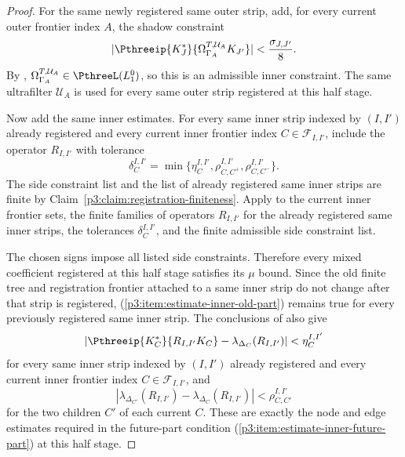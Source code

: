 \documentclass[11pt,reqno]{amsart}
\makeatletter
\theoremstyle{plain}
\theoremstyle{definition}
\newcounter{problempaper}
\newenvironment{problempaperbody}{%
  \setcounter{subsection}{0}%
  \setcounter{subsubsection}{0}%
  \setcounter{paragraph}{0}%
  \renewcommand{\thesubsection}{\arabic{subsection}}%
  \renewcommand{\thesubsubsection}{\thesubsection.\arabic{subsubsection}}%
  \renewcommand{\theparagraph}{\thesubsubsection.\arabic{paragraph}}%
  \let\problem@outersection\section
  \let\problem@outersubsection\subsection
  \let\problem@outersubsubsection\subsubsection
  \let\problem@outerparagraph\paragraph
  \let\section\problem@papersection
  \let\subsection\problem@papersubsection
  \let\subsubsection\problem@papersubsubsection
}{%
  \let\section\problem@outersection
  \let\subsection\problem@outersubsection
  \let\subsubsection\problem@outersubsubsection
  \let\paragraph\problem@outerparagraph
}
\newcommand{\problem@target}[2]{%
  \hypertarget{problem-\theproblempaper-#1-#2}{}%
}
\newcommand{\problem@paperheading}[3]{%
  \par\bigskip
  \problem@target{#1}{#2}%
  \noindent{\large\bfseries #2.\quad #3\par}%
  \nobreak\smallskip
}
\newcommand{\problem@papersubheading}[3]{%
  \par\medskip
  \problem@target{#1}{#2}%
  \noindent{\normalsize\bfseries #2.\quad #3\par}%
  \nobreak\smallskip
}
\newcommand{\problem@papersubsubheading}[3]{%
  \par\smallskip
  \problem@target{#1}{#2}%
  \noindent{\normalsize\itshape #2.\quad #3.\ }%
}
\def\problem@papersection{%
  \@ifstar{\problem@papersectionstar}{\problem@papersectionnostar}%
}
\def\problem@papersectionstar#1{%
  \par\bigskip\noindent{\large\bfseries #1\par}\nobreak\smallskip
}
\def\problem@papersectionnostar#1{%
  \refstepcounter{subsection}%
  \setcounter{subsubsection}{0}%
  \setcounter{paragraph}{0}%
  \problem@paperheading{section}{\thesubsection}{#1}%
  \problem@writecontentsline{section}{\thesubsection}{#1}%
}
\def\problem@papersubsection{%
  \@ifstar{\problem@papersubsectionstar}{\problem@papersubsectionnostar}%
}
\def\problem@papersubsectionstar#1{%
  \par\medskip\noindent{\normalsize\bfseries #1\par}\nobreak\smallskip
}
\def\problem@papersubsectionnostar#1{%
  \refstepcounter{subsubsection}%
  \setcounter{paragraph}{0}%
  \problem@papersubheading{subsection}{\thesubsubsection}{#1}%
  \problem@writecontentsline{subsection}{\thesubsubsection}{#1}%
}
\def\problem@papersubsubsection{%
  \@ifstar{\problem@papersubsubsectionstar}{\problem@papersubsubsectionnostar}%
}
\def\problem@papersubsubsectionstar#1{%
  \par\smallskip\noindent{\normalsize\itshape #1.\ }%
}
\def\problem@papersubsubsectionnostar#1{%
  \refstepcounter{paragraph}%
  \problem@papersubsubheading{subsubsection}{\theparagraph}{#1}%
  \problem@writecontentsline{subsubsection}{\theparagraph}{#1}%
}
\newcommand{\problem@writecontentsline}[3]{%
  \begingroup
  \protected@write\@auxout{}{%
    \string\problemcontentsentry{\theproblempaper}{#1}{#2}{#3}{\thepage}%
  }%
  \endgroup
}
\newcommand{\problemcontentsentry}[5]{%
  \@ifundefined{problemcontents@#1}{%
    \expandafter\gdef\csname problemcontents@#1\endcsname{}%
  }{}%
  \expandafter\g@addto@macro\csname problemcontents@#1\endcsname{%
    \problemcontentsline{#1}{#2}{#3}{#4}{#5}%
  }%
}
\newcommand{\problemcontentslink}[4]{%
  \hyperlink{problem-#1-#2-#3}{#4}%
}
\newcommand{\problemcontentsline}[5]{%
  \ifstrequal{#2}{section}{%
    \par\noindent
    \problemcontentslink{#1}{#2}{#3}{\makebox[2.5em][l]{#3}#4}%
    \nobreak\dotfill
    \problemcontentslink{#1}{#2}{#3}{#5}\par
  }{%
    \ifstrequal{#2}{subsection}{%
      \par\noindent\hspace*{1.5em}%
      \problemcontentslink{#1}{#2}{#3}{\makebox[3.5em][l]{#3}#4}%
      \nobreak\dotfill
      \problemcontentslink{#1}{#2}{#3}{#5}\par
    }{%
      \par\noindent\hspace*{3em}%
      \problemcontentslink{#1}{#2}{#3}{\makebox[4.5em][l]{#3}#4}%
      \nobreak\dotfill
      \problemcontentslink{#1}{#2}{#3}{#5}\par
    }%
  }%
}
\makeatother
\begin{document}
\begin{problempaperbody}
\begin{proof}
For the same newly registered same outer strip, add, for every current outer frontier index $A$, the shadow constraint
\begin{equation*}
        |\Pthreeip{K_J^*}{\Omega_{\Gamma_A}^{T,\mathcal U_A}K_{J'}}|<\frac{\sigma_{J,J'}}{8}.
\end{equation*}
By , $\Omega_{\Gamma_A}^{T,\mathcal U_A}\in\PthreeL(L_1^0)$, so this is an admissible inner constraint. The same ultrafilter $\mathcal U_A$ is used for every same outer strip registered at this half stage.

Now add the same inner estimates. For every same inner strip indexed by $(I,I')$ already registered and every current inner frontier index $C\in\mathcal F_{I,I'}$, include the operator $R_{I,I'}$ with tolerance
\begin{equation*}
        \delta_C^{I,I'}=\min\{\eta_C^{I,I'},\rho_{C,C^+}^{I,I'},\rho_{C,C^-}^{I,I'}\}.
\end{equation*}
The side constraint list and the list of already registered same inner strips are finite by Claim~\ref{p3:claim:registration-finiteness}. Apply  to the current inner frontier sets, the finite families of operators $R_{I,I'}$ for the already registered same inner strips, the tolerances $\delta_C^{I,I'}$, and the finite admissible side constraint list.

The chosen signs impose all listed side constraints. Therefore every mixed coefficient registered at this half stage satisfies its $\mu$ bound. Since the old finite tree and registration frontier attached to a same inner strip do not change after that strip is registered, \textup{(\ref{p3:item:estimate-inner-old-part})} remains true for every previously registered same inner strip. The conclusions of  also give
\begin{equation*}
        |\Pthreeip{K_C^*}{R_{I,I'}K_C}-\lambda_{\Delta_C}(R_{I,I'})|<\eta_C^{I,I'}
\end{equation*}
for every same inner strip indexed by $(I,I')$ already registered and every current inner frontier index $C\in\mathcal F_{I,I'}$, and
\begin{equation*}
        |\lambda_{\Delta_{C'}}(R_{I,I'})-\lambda_{\Delta_C}(R_{I,I'})|<\rho_{C,C'}^{I,I'}
\end{equation*}
for the two children $C'$ of each current $C$. These are exactly the node and edge estimates required in the future-part condition \textup{(\ref{p3:item:estimate-inner-future-part})} at this half stage.


\end{proof}
\end{problempaperbody}
\end{document}
